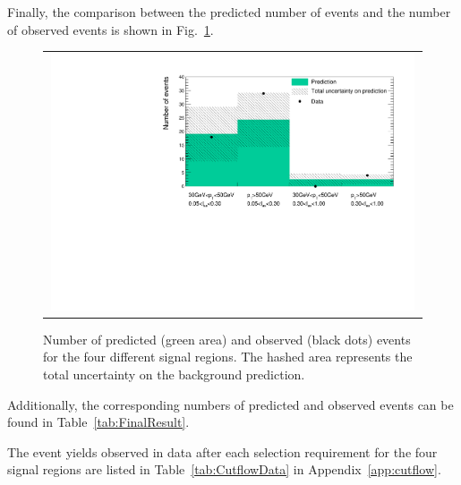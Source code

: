 Finally, the comparison between the predicted number of events and the number of observed events is shown in Fig.~\ref{fig:FinalResult}.
\begin{figure}[!t]
  \centering 
  \begin{tabular}{c}
    \includegraphics[width=0.99\textwidth]{figures/analysis/Results/FinalResultPlot.pdf} 
  \end{tabular}
  \caption{Number of predicted (green area) and observed (black dots) events for the four different signal regions. The hashed area represents the total uncertainty on the background prediction.}
  \label{fig:FinalResult}
 \vspace{50pt}
\end{figure} 
Additionally, the corresponding numbers of predicted and observed events can be found in Table~\ref{tab:FinalResult}.
\renewcommand{\arraystretch}{1.5}
\begin{table}[!h]
\centering
\caption{Number of predicted and observed events for the four different signal regions. FIXME: different lables.}
\label{tab:FinalResult}
\end{table}
The event yields observed in data after each selection requirement for the four signal regions are listed in Table~\ref{tab:CutflowData} in Appendix~\ref{app:cutflow}.

